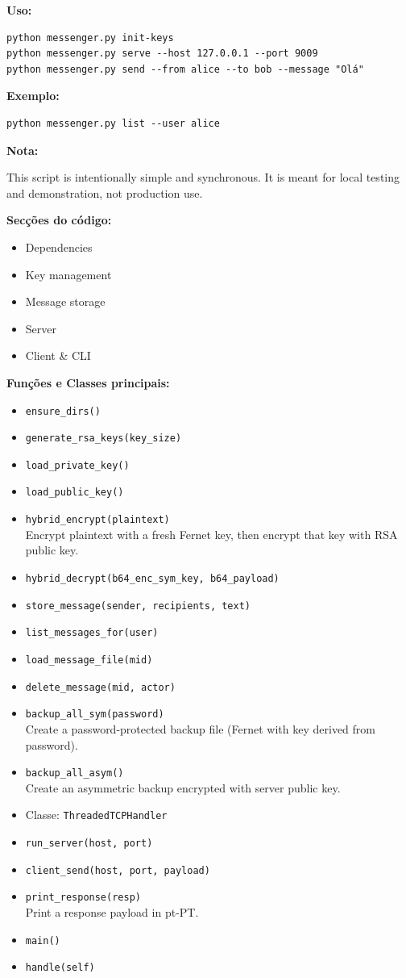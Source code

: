 \documentclass[a4paper,11pt]{article}
\begin{document}
\textbf{Uso:}
\begin{verbatim}
python messenger.py init-keys
python messenger.py serve --host 127.0.0.1 --port 9009
python messenger.py send --from alice --to bob --message "Olá"
\end{verbatim}

\textbf{Exemplo:}
\begin{verbatim}
python messenger.py list --user alice
\end{verbatim}

\textbf{Nota:}

This script is intentionally simple and synchronous. It is meant for local
testing and demonstration, not production use.

\textbf{Secções do código:}
\begin{itemize}
    \item Dependencies
    \item Key management
    \item Message storage
    \item Server
    \item Client \& CLI
\end{itemize}

\textbf{Funções e Classes principais:}
\begin{itemize}
    \item \texttt{ensure\_dirs()}
    \item \texttt{generate\_rsa\_keys(key\_size)}
    \item \texttt{load\_private\_key()}
    \item \texttt{load\_public\_key()}
    \item \texttt{hybrid\_encrypt(plaintext)}
    \\ Encrypt plaintext with a fresh Fernet key, then encrypt that key with RSA public key.
    \item \texttt{hybrid\_decrypt(b64\_enc\_sym\_key, b64\_payload)}
    \item \texttt{store\_message(sender, recipients, text)}
    \item \texttt{list\_messages\_for(user)}
    \item \texttt{load\_message\_file(mid)}
    \item \texttt{delete\_message(mid, actor)}
    \item \texttt{backup\_all\_sym(password)}
    \\ Create a password-protected backup file (Fernet with key derived from password).
    \item \texttt{backup\_all\_asym()}
    \\ Create an asymmetric backup encrypted with server public key.
    \item Classe: \texttt{ThreadedTCPHandler}
    \item \texttt{run\_server(host, port)}
    \item \texttt{client\_send(host, port, payload)}
    \item \texttt{print\_response(resp)}
    \\ Print a response payload in pt-PT.
    \item \texttt{main()}
    \item \texttt{handle(self)}
\end{itemize}
\end{document}
